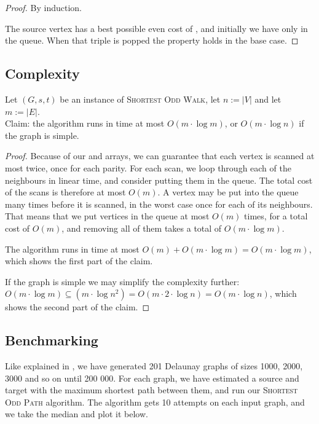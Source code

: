 \begin{proof}
By induction. 

The source vertex  has a best possible even cost of , and initially we have only  in the queue. When that triple is popped the property holds in the base case.


\end{proof}

\subsection{Complexity}
Let $(G,s,t)$ be an instance of \textsc{Shortest Odd Walk}, let $n := |V|$ and let $m := |E|$.\\
Claim: the algorithm runs in time at most $O(m \cdot \log m)$, or $O(m \cdot \log n)$ if the graph is simple.
\begin{proof}
    Because of our  and  arrays, we can guarantee that each vertex is scanned at most twice, once for each parity. For each scan, we loop through each of the neighbours in linear time, and consider putting them in the queue. The total cost of the scans is therefore at most $O(m)$. A vertex may be put into the queue many times before it is scanned, in the worst case once for each of its neighbours. That means that we put vertices in the queue at most $O(m)$ times, for a total cost of $O(m)$, and removing all of them takes a total of $O(m \cdot \log m)$. 
    
    The algorithm runs in time at most $O(m) + O(m \cdot \log m) = O(m \cdot \log m)$, which shows the first part of the claim.
    
    If the graph is simple we may simplify the complexity further: $O(m \cdot \log m) \subseteq (m \cdot \log n^2) = O(m \cdot 2 \cdot \log n) = O(m \cdot \log n)$, which shows the second part of the claim.
\end{proof}

\subsection{Benchmarking}
Like explained in , we have generated 201 Delaunay graphs of sizes 1000, 2000, 3000 and so on until 200 000. For each graph, we have estimated a source and target with the maximum shortest path between them, and run our \textsc{Shortest Odd Path} algorithm. The algorithm gets 10 attempts on each input graph, and we take the median and plot it below.

